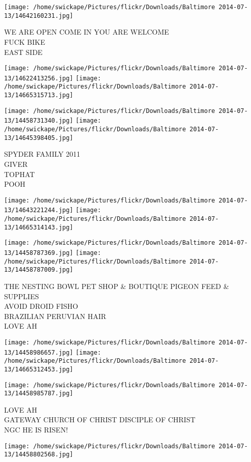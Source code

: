 \documentclass[10pt,letterpaper]{article}
\begin{document}
\vspace{0.25in}
\texttt{[image: /home/swickape/Pictures/flickr/Downloads/Baltimore 2014-07-13/14642160231.jpg]}

WE ARE OPEN COME IN YOU ARE WELCOME\\
FUCK BIKE\\
EAST SIDE
\pagebreak

\texttt{[image: /home/swickape/Pictures/flickr/Downloads/Baltimore 2014-07-13/14622413256.jpg]}
\texttt{[image: /home/swickape/Pictures/flickr/Downloads/Baltimore 2014-07-13/14665315713.jpg]}

\texttt{[image: /home/swickape/Pictures/flickr/Downloads/Baltimore 2014-07-13/14458731340.jpg]}
\texttt{[image: /home/swickape/Pictures/flickr/Downloads/Baltimore 2014-07-13/14645398405.jpg]}

SPYDER FAMILY 2011\\
GIVER\\
TOPHAT\\
POOH
\pagebreak

\texttt{[image: /home/swickape/Pictures/flickr/Downloads/Baltimore 2014-07-13/14643221244.jpg]}
\texttt{[image: /home/swickape/Pictures/flickr/Downloads/Baltimore 2014-07-13/14665314143.jpg]}

\texttt{[image: /home/swickape/Pictures/flickr/Downloads/Baltimore 2014-07-13/14458787369.jpg]}
\texttt{[image: /home/swickape/Pictures/flickr/Downloads/Baltimore 2014-07-13/14458787009.jpg]}

THE NESTING BOWL PET SHOP \& BOUTIQUE PIGEON FEED \& SUPPLIES\\
AVOID DROID FISHO\\
BRAZILIAN PERUVIAN HAIR\\
LOVE AH
\pagebreak

\texttt{[image: /home/swickape/Pictures/flickr/Downloads/Baltimore 2014-07-13/14458986657.jpg]}
\texttt{[image: /home/swickape/Pictures/flickr/Downloads/Baltimore 2014-07-13/14665312453.jpg]}

\texttt{[image: /home/swickape/Pictures/flickr/Downloads/Baltimore 2014-07-13/14458985787.jpg]}

LOVE AH\\
GATEWAY CHURCH OF CHRIST DISCIPLE OF CHRIST\\
NGC HE IS RISEN!
\pagebreak

\texttt{[image: /home/swickape/Pictures/flickr/Downloads/Baltimore 2014-07-13/14458802568.jpg]}
\end{document}
